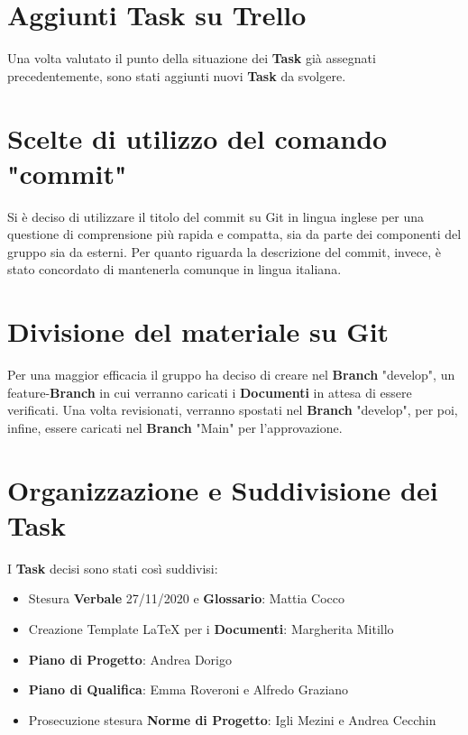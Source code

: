 	\section{Aggiunti Task su Trello}
	Una volta valutato il punto della situazione dei \textbf{Task} già assegnati precedentemente, sono stati aggiunti nuovi \textbf{Task} da svolgere.
	
	\section{Scelte di utilizzo del comando "commit"}
	Si è deciso di utilizzare il titolo del commit su Git in lingua inglese per una questione di comprensione più rapida e compatta, sia da parte dei componenti del gruppo sia da esterni.
	Per quanto riguarda la descrizione del commit, invece, è stato concordato di mantenerla comunque in lingua italiana.
	
	\section{Divisione del materiale su Git}
	Per una maggior efficacia il gruppo ha deciso di creare nel \textbf{Branch} "develop", un feature-\textbf{Branch} in cui verranno caricati i \textbf{Documenti}
	in attesa di essere verificati. 
	Una volta revisionati, verranno spostati nel \textbf{Branch} "develop", per poi, infine, essere caricati nel \textbf{Branch}  "Main" per l'approvazione.
	
	\section{Organizzazione e Suddivisione dei Task}
	I \textbf{Task} decisi sono stati così suddivisi:
	\begin{itemize}
		\item Stesura \textbf{Verbale} 27/11/2020 e \textbf{Glossario}: Mattia Cocco
		\item Creazione Template LaTeX per i \textbf{Documenti}: Margherita Mitillo
		\item \textbf{Piano di Progetto}: Andrea Dorigo
		\item \textbf{Piano di Qualifica}: Emma Roveroni e Alfredo Graziano
		\item Prosecuzione stesura \textbf{Norme di Progetto}: Igli Mezini e Andrea Cecchin		
	\end{itemize}
	